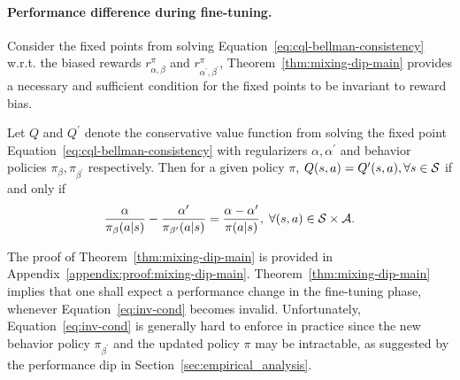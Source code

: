 \paragraph{Performance difference during fine-tuning.} 
Consider the fixed points from solving Equation~\ref{eq:cql-bellman-consistency} w.r.t. the biased rewards $r^\pi_{\alpha,\beta}$ and $r^\pi_{\alpha^\prime,\beta^\prime}$, Theorem~\ref{thm:mixing-dip-main} provides a necessary and sufficient condition for the fixed points to be invariant to reward bias.
\begin{theorem}
\label{thm:mixing-dip-main}
Let $Q$ and $Q^\prime$ denote the conservative value function from solving the fixed point Equation~\ref{eq:cql-bellman-consistency}
with regularizers $\alpha,\alpha^\prime$ and behavior policies $\pi_\beta,\pi_{\beta^\prime}$ respectively. Then for a given policy $\pi$, $Q(s,a) = Q^\prime(s,a),\forall s\in \mathcal S$ if and only if
\begin{equation}
    \label{eq:inv-cond}
    \footnotesize{
    \frac{\alpha}{\pi_\beta(a|s)}-\frac{\alpha^\prime}{\pi_{\beta^\prime}(a|s)}=\frac{\alpha-\alpha^\prime}{\pi(a|s)},\;\forall (s,a)\in \mc S\times \mc A.}
\end{equation}
\end{theorem}
The proof of Theorem~\ref{thm:mixing-dip-main} is provided in Appendix~\ref{appendix:proof:mixing-dip-main}. Theorem~\ref{thm:mixing-dip-main} implies that one shall expect a performance change in the fine-tuning phase, whenever Equation~\ref{eq:inv-cond} becomes invalid. Unfortunately, Equation~\ref{eq:inv-cond} is generally hard to enforce in practice since the new behavior policy $\pi_{\beta^\prime}$ and the updated policy $\pi$ may be intractable, as suggested by the performance dip in Section~\ref{sec:empirical_analysis}.

